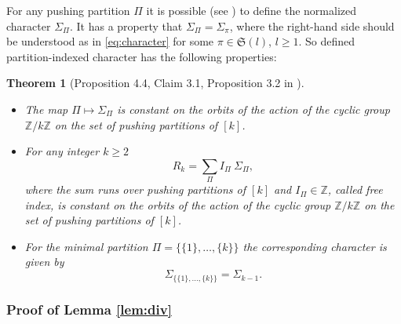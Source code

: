 \documentclass[12pt]{amsart}
\theoremstyle{plain}
\newtheorem{lemma}{Lemma}[section]
\newtheorem{theorem}[lemma]{Theorem}
\theoremstyle{remark}
\newcommand{\Sym}{\mathfrak{S}}
\newcommand{\Z}{\mathbb{Z}}
\begin{document}
For any pushing partition $\Pi$ it is possible (see \cite{'Sniady2006a}) to define the normalized character
$\Sigma_\Pi$. It has a property that $\Sigma_\Pi=\Sigma_\pi$, where the right-hand side should
be understood as in \eqref{eq:character} for some $\pi\in\Sym(l)$, $l\geq 1$. So defined partition-indexed character
has the following properties:
\begin{theorem}[Proposition 4.4, Claim 3.1, Proposition 3.2 in \cite{'Sniady2006a}]
\label{theo:discrete-math}
\
\begin{itemize}
 \item The map $\Pi\mapsto\Sigma_\Pi$ is constant on the orbits of the action of the cyclic group $\Z/ k \Z$ on
the set of pushing partitions of $[k]$.
   \item For any integer $k\geq 2$
\begin{equation} 
  \label{eq:pushing}
  R_k = \sum_{\Pi} I_\Pi\ \Sigma_\Pi ,
\end{equation}
where the sum runs over pushing partitions of $[k]$ and $I_\Pi\in \Z$, called free index, is constant on the orbits of
the action of the cyclic group $\Z/ k \Z$ on the set of pushing partitions of $[k]$.
 \item For the minimal partition $\Pi=\big\{ \{1\}, \dots, \{k\} \big\}$ the corresponding character is given by
     $$ \Sigma_{ \{ \{1\}, \dots, \{k\} \} } = \Sigma_{k-1}. $$
\end{itemize}

\end{theorem}




\subsubsection{Proof of Lemma \ref{lem:div}}
\end{document}
